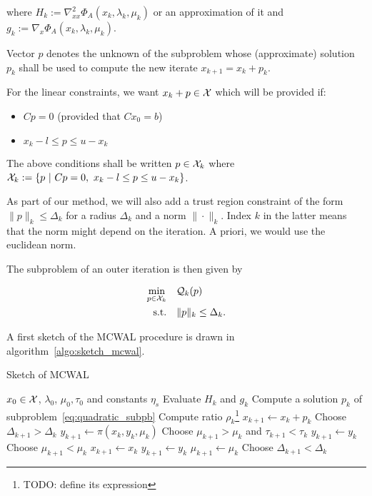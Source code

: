 \documentclass[10pt]{article}
\numberwithin{equation}{section}
\begin{document}
	 where $H_k:=\nabla^2_{xx} \Phi_A(x_k,\lambda_k,\mu_k)$ or an approximation of it and $g_k:=\nabla_x \Phi_A(x_k,\lambda_k,\mu_k)$.
	 
	 Vector $p$ denotes the unknown of the subproblem whose (approximate) solution $p_k$ shall be used to compute the new iterate $x_{k+1}=x_k+p_k$.
	 
	 For the linear constraints, we want $x_k+p\in {\mathcal{X}}$ which will be provided if:
	 \begin{itemize}
	 	\item \(Cp=0\) (provided that $Cx_0=b$)
	 	\item$ x_k-l \le p \le u-x_k$
	 \end{itemize}
	 The above conditions shall be written $p\in {\mathcal{X}}_k$ where ${\mathcal{X}}_k:= \left\{p \ | \ Cp=0,\ x_k-l \le p \le u-x_k\right\}$.
	 
	As part of our method, we will also add a trust region constraint of the form $\|p\|_k \le \Delta_k$ for a radius $\Delta_k$ and a norm $\|\cdot\|_k$. Index $k$ in the latter means that the norm might depend on the iteration. A priori, we would use the euclidean norm.
	
	The subproblem of an outer iteration is then given by
	
	\begin{equation}\label{eq:quadratic_subpb} 
		\begin{aligned}
			\min_{p\in {\mathcal{X}}_k} \quad& {\mathcal{Q}}_k(p)  \\
			\text{s.t.}  \quad &  \|p\|_k \le \Delta_k.
		\end{aligned}	
	\end{equation}
	
	A first sketch of the MCWAL procedure is drawn in algorithm~\ref{algo:sketch_mcwal}.
	 \begin{algorithm}
	 	\caption{Sketch of MCWAL}\label{algo:sketch_mcwal}
	 	\begin{algorithmic}
	 		\Require $x_0\in {\mathcal{X}}$, $\lambda_0$, $\mu_0, \tau_0$ and constants $\eta_s$
	 		\State Evaluate $H_k$ and $g_k$ 
	 		\State Compute a solution $p_k$ of subproblem~\eqref{eq:quadratic_subpb} 
	 		\State Compute ratio $\rho_k$\footnote{TODO: define its expression}
	 		 
	 		\State $x_{k+1} \gets x_k+p_k$
	 		\State Choose $\Delta_{k+1} > \Delta_k$
	 		\State $y_{k+1} \gets \pi(x_k,y_k,\mu_k)$
	 		\State Choose $\mu_{k+1} > \mu_k$ and $\tau_{k+1} < \tau_k$
	 		\Else
	 		\State $y_{k+1} \gets y_k$
	 		\State Choose $\mu_{k+1} < \mu_k$
	 		\EndIf
	 		\Else {}
	 		\State  $x_{k+1} \gets x_k$
	 		\State  $y_{k+1} \gets y_k$
	 		\State  $\mu_{k+1} \gets \mu_k$
	 		\State Choose $\Delta_{k+1} < \Delta_k$
	 		\EndIf
	 		\EndWhile
	 	\end{algorithmic}
	 \end{algorithm}
	

	\clearpage
	
	
	
\end{document}
